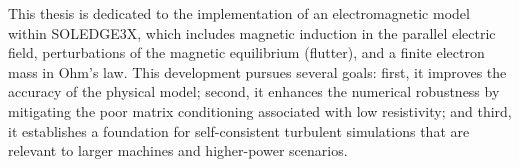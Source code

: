 This thesis is dedicated to the implementation of an electromagnetic model within SOLEDGE3X, which includes magnetic induction in the parallel electric field, perturbations of the magnetic equilibrium (flutter), and a finite electron mass in Ohm's law. This development pursues several goals: first, it improves the accuracy of the physical model; second, it enhances the numerical robustness by mitigating the poor matrix conditioning associated with low resistivity; and third, it establishes a foundation for self-consistent turbulent simulations that are relevant to larger machines and higher-power scenarios.